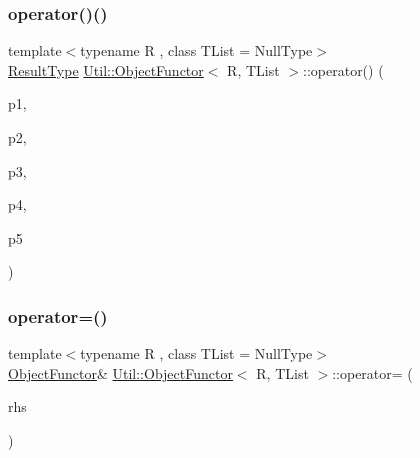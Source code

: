 \mbox{\label{classUtil_1_1ObjectFunctor_a95b7e08a92f54e2ce8a90153c1414abd}} 
\subsubsection{\texorpdfstring{operator()()}{operator()()}\hspace{0.1cm}{\footnotesize\ttfamily [12/12]}}
{\footnotesize\ttfamily template$<$typename R , class T\+List  = Null\+Type$>$ \\
\mbox{\hyperlink{classUtil_1_1ObjectFunctor_a77f816e98108848347d0dfc085090a1c}{Result\+Type}} \mbox{\hyperlink{classUtil_1_1ObjectFunctor}{Util\+::\+Object\+Functor}}$<$ R, T\+List $>$\+::operator() (\begin{DoxyParamCaption}\item[{\mbox{\hyperlink{classUtil_1_1ObjectFunctor_a199715d28029627c2ae7219c13b04d26}{Parm1}}}]{p1,  }\item[{\mbox{\hyperlink{classUtil_1_1ObjectFunctor_a6809cf65883dc7575e01d9b9849649cf}{Parm2}}}]{p2,  }\item[{\mbox{\hyperlink{classUtil_1_1ObjectFunctor_a6becd26610c6091b9ba93cd96f3def66}{Parm3}}}]{p3,  }\item[{\mbox{\hyperlink{classUtil_1_1ObjectFunctor_a54ce0b64981cd7f558ce8eea7df3f1b2}{Parm4}}}]{p4,  }\item[{\mbox{\hyperlink{classUtil_1_1ObjectFunctor_a8428e04dd3fb91bc7f7c518a1771eecb}{Parm5}}}]{p5 }\end{DoxyParamCaption})\hspace{0.3cm}{\ttfamily [inline]}}

\mbox{\label{classUtil_1_1ObjectFunctor_a90395c8be24965e154bee2f7813a78e8}} 
\subsubsection{\texorpdfstring{operator=()}{operator=()}\hspace{0.1cm}{\footnotesize\ttfamily [1/2]}}
{\footnotesize\ttfamily template$<$typename R , class T\+List  = Null\+Type$>$ \\
\mbox{\hyperlink{classUtil_1_1ObjectFunctor}{Object\+Functor}}\& \mbox{\hyperlink{classUtil_1_1ObjectFunctor}{Util\+::\+Object\+Functor}}$<$ R, T\+List $>$\+::operator= (\begin{DoxyParamCaption}\item[{const \mbox{\hyperlink{classUtil_1_1ObjectFunctor}{Object\+Functor}}$<$ R, T\+List $>$ \&}]{rhs }\end{DoxyParamCaption})\hspace{0.3cm}{\ttfamily [inline]}}

